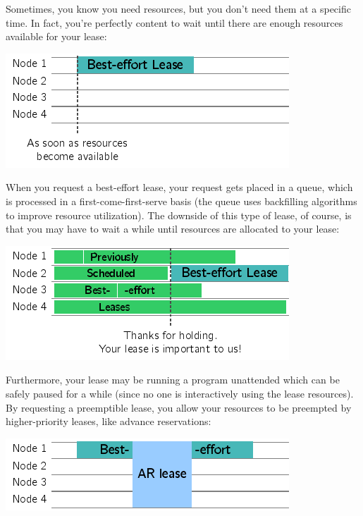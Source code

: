 Sometimes, you know you need resources, but you don't need them at a specific time. In fact, you're perfectly content to wait until there are enough resources available for your lease:

\begin{center}
\includegraphics{images/lease_be1.png}
\end{center}


When you request a best-effort lease, your request gets placed in a queue, which is processed in a first-come-first-serve basis (the queue uses backfilling algorithms to improve resource utilization). The downside of this type of lease, of course, is that you may have to wait a while until resources are allocated to your lease:

\begin{center}
\includegraphics{images/lease_be2.png}
\end{center}

Furthermore, your lease may be running a program unattended which can be safely paused for a while (since no one is interactively using the lease resources). By requesting a preemptible lease, you allow your resources to be preempted by higher-priority leases, like advance reservations:

\begin{center}
\includegraphics{images/lease_be3.png}
\end{center}

